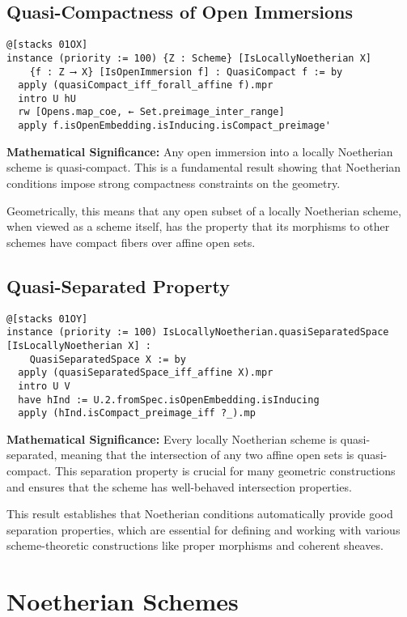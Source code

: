 \documentclass{article}
\theoremstyle{definition}
\begin{document}
\subsection{Quasi-Compactness of Open Immersions}

\begin{lstlisting}
@[stacks 01OX]
instance (priority := 100) {Z : Scheme} [IsLocallyNoetherian X]
    {f : Z ⟶ X} [IsOpenImmersion f] : QuasiCompact f := by
  apply (quasiCompact_iff_forall_affine f).mpr
  intro U hU
  rw [Opens.map_coe, ← Set.preimage_inter_range]
  apply f.isOpenEmbedding.isInducing.isCompact_preimage'
\end{lstlisting}

\textbf{Mathematical Significance:} Any open immersion into a locally Noetherian scheme is quasi-compact. This is a fundamental result showing that Noetherian conditions impose strong compactness constraints on the geometry.

Geometrically, this means that any open subset of a locally Noetherian scheme, when viewed as a scheme itself, has the property that its morphisms to other schemes have compact fibers over affine open sets.

\subsection{Quasi-Separated Property}

\begin{lstlisting}
@[stacks 01OY]
instance (priority := 100) IsLocallyNoetherian.quasiSeparatedSpace [IsLocallyNoetherian X] :
    QuasiSeparatedSpace X := by
  apply (quasiSeparatedSpace_iff_affine X).mpr
  intro U V
  have hInd := U.2.fromSpec.isOpenEmbedding.isInducing
  apply (hInd.isCompact_preimage_iff ?_).mp
\end{lstlisting}

\textbf{Mathematical Significance:} Every locally Noetherian scheme is quasi-separated, meaning that the intersection of any two affine open sets is quasi-compact. This separation property is crucial for many geometric constructions and ensures that the scheme has well-behaved intersection properties.

This result establishes that Noetherian conditions automatically provide good separation properties, which are essential for defining and working with various scheme-theoretic constructions like proper morphisms and coherent sheaves.

\section{Noetherian Schemes}
\end{document}
